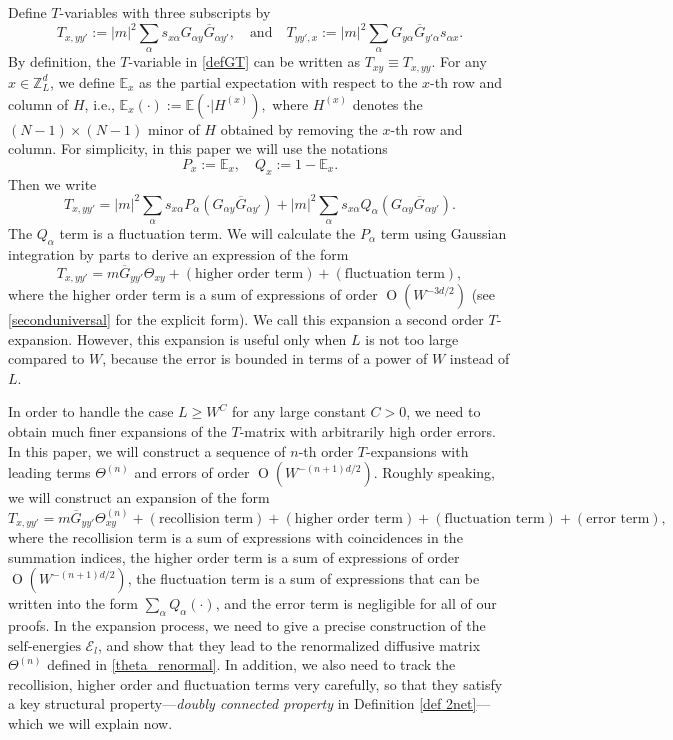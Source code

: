 \documentclass{article}
\newcommand{\1}{\mathds{1}}
\numberwithin{equation}{section}
\newcommand{\al}{\alpha}
\newcommand{\be}{\begin{equation}}
\newcommand{\ee}{\end{equation}}
\renewcommand{\geq}{\geqslant}
\renewcommand{\ge}{\geq}
\newcommand{\E}{\mathbb{E}}
\newcommand{\Z}{\mathbb{Z}}
\newcommand{\selfs}{\text{self-energies}}
\DeclareMathOperator{\OO}{O}
\theoremstyle{plain} %
\theoremstyle{remark}
\newcommand{\cor}{\color{red}}
\newcommand{\Sele}{{\mathcal E}}
\newcommand{\hty}[1]{{\cor (ht: #1) }}
\begin{document}
Define $T$-variables with three subscripts by 
\be\label{general_T}
T_{x,yy'}:=|m|^2\sum_\al s_{x\al}G_{\al y}\overline G_{\al y'},\quad \text{and}\quad T_{yy',x}:=|m|^2\sum_\al G_{ y\al }\overline G_{y' \al}s_{\al x}. 
\ee
By definition, the $T$-variable in \eqref{defGT} can be written as $T_{xy}\equiv T_{x,yy}$. For any $x\in \Z_L^d$, we define $\E_x$ as the partial expectation with respect to the $x$-th row and column of $H$, i.e., $\E_x(\cdot) := \E(\cdot|H^{(x)}),$ where $H^{(x)}$ denotes the $(N-1)\times(N-1)$ minor of $H$ obtained by removing the $x$-th row and column. For simplicity, in this paper we will use the notations 
$$P_x :=\E_x , \quad Q_x := 1-\E_x.$$
Then we write 
$$T_{x,yy'}=|m|^2\sum_{\al} s_{x\al} P_\al \left(G_{\al y}\overline G_{\al y'}\right)  + |m|^2\sum_{\al} s_{x\al} Q_\al \left(G_{\al y}\overline G_{\al y'}\right) . $$
The $Q_\al$ term is a fluctuation term. We will calculate the $P_\al$ term using Gaussian integration by parts to derive an expression of the form 
\be\nonumber
T_{x,yy'} =m \overline G_{yy'} \Theta_{xy} +  (\text{higher order term}) + (\text{fluctuation term}),
\ee
where the higher order term is a sum of expressions of order $\OO(W^{-3d/2})$ (see \eqref{seconduniversal} for the explicit form). We call this expansion a second order $T$-expansion. However, this expansion is useful only when $L$ is not too large compared to $W$, because the error is bounded in terms of a power of $W$ instead of $L$. %


In order to handle the case $L\ge W^C$ for any large constant $C>0$, we need to obtain much finer expansions of the $T$-matrix with arbitrarily high order errors. In this paper, we will construct a sequence of $n$-th order $T$-expansions with leading terms $\Theta^{(n)}$ and errors of order $\OO(W^{-(n+1)d/2})$. Roughly speaking, we will construct an expansion of the form  
\be\label{T-exp-intro}
T_{x,yy'} =m \overline G_{yy'}  \Theta^{(n)}_{xy} + (\text{recollision term}) + (\text{higher order term}) + (\text{fluctuation term}) + (\text{error term}),
\ee
where the recollision term is a sum of expressions with coincidences in the summation indices, the higher order term is a sum of expressions of order $\OO(W^{-(n+1)d/2})$, the fluctuation term is a sum of expressions that can be written into the form $\sum_\al Q_\al(\cdot)$, and the error term is negligible for all of our proofs. %
In the expansion process, we need to give a precise construction of the $\selfs$ $\Sele_l$, and show that they lead to the renormalized diffusive matrix $\Theta^{(n)}$ defined in \eqref{theta_renormal}. In addition, we also need to track the recollision, higher order and fluctuation terms very carefully, so that they satisfy a key structural property---\emph{doubly connected property} in Definition \ref{def 2net}---which we will explain now. 
\end{document}
